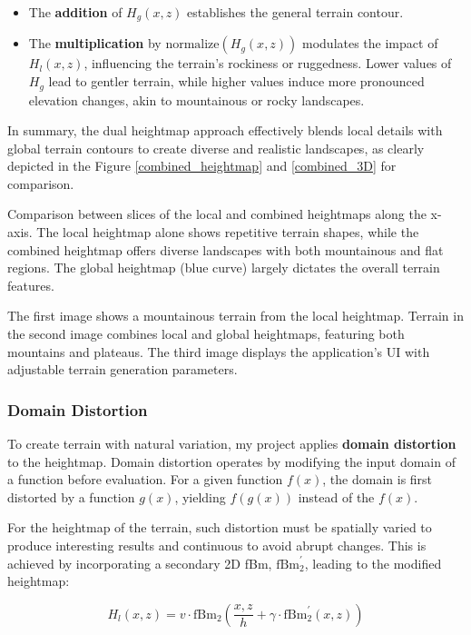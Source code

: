 \begin{itemize}
    \item The \textbf{addition} of $H_{g}(x,z)$ establishes the general terrain contour.
    \item The \textbf{multiplication} by $\text{normalize}(H_{g}(x,z))$ modulates the impact of $H_{l}(x,z)$, influencing the terrain's rockiness or ruggedness. Lower values of $H_{g}$ lead to gentler terrain, while higher values induce more pronounced elevation changes, akin to mountainous or rocky landscapes.
\end{itemize}

In summary, the dual heightmap approach effectively blends local details with global terrain contours to create diverse and realistic landscapes, as clearly depicted in the Figure \ref{combined_heightmap} and \ref{combined_3D} for comparison.

{Comparison between slices of the local and combined heightmaps along the x-axis. The local heightmap alone shows repetitive terrain shapes, while the combined heightmap offers diverse landscapes with both mountainous and flat regions. The global heightmap (blue curve) largely dictates the overall terrain features.}

{The first image shows a mountainous terrain from the local heightmap. Terrain in the second image combines local and global heightmaps, featuring both mountains and plateaus. The third image displays the application's UI with adjustable terrain generation parameters.}


\subsubsection{Domain Distortion}
\label{Domain Distortion}

To create terrain with natural variation, my project applies \textbf{domain distortion} to the heightmap. Domain distortion operates by modifying the input domain of a function before evaluation. For a given function $f(x)$, the domain is first distorted by a function $g(x)$, yielding $f(g(x))$ instead of the $f(x)$.

For the heightmap of the terrain, such distortion must be spatially varied to produce interesting results and continuous to avoid abrupt changes. This is achieved by incorporating a secondary 2D fBm, $\text{fBm}^\prime_2$, leading to the modified heightmap:

\begin{equation}
    H_l(x,z) = v\cdot\text{fBm}_{2}\left(\frac{x,z}{h}+\gamma\cdot\text{fBm}^\prime_2(x,z)\right)
\end{equation}

